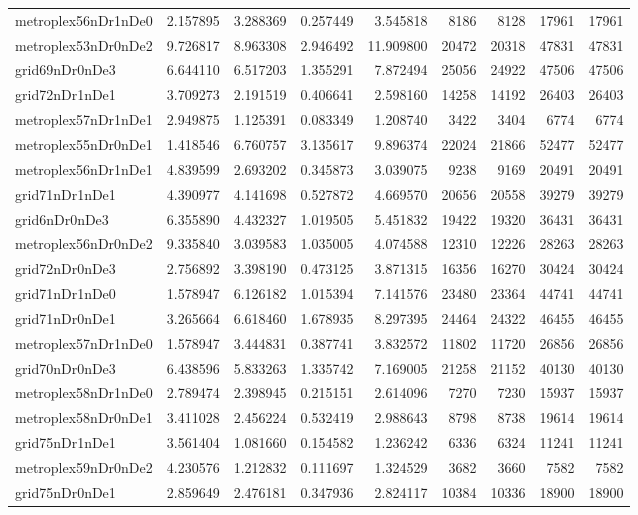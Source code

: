\begin{longtable}{|l|r|r|r|r|r|r|r|r|}
metroplex56nDr1nDe0 & 2.157895 & 3.288369 & 0.257449 & 3.545818 & 8186 & 8128 & 17961 & 17961 \\
metroplex53nDr0nDe2 & 9.726817 & 8.963308 & 2.946492 & 11.909800 & 20472 & 20318 & 47831 & 47831 \\
grid69nDr0nDe3 & 6.644110 & 6.517203 & 1.355291 & 7.872494 & 25056 & 24922 & 47506 & 47506 \\
grid72nDr1nDe1 & 3.709273 & 2.191519 & 0.406641 & 2.598160 & 14258 & 14192 & 26403 & 26403 \\
metroplex57nDr1nDe1 & 2.949875 & 1.125391 & 0.083349 & 1.208740 & 3422 & 3404 & 6774 & 6774 \\
metroplex55nDr0nDe1 & 1.418546 & 6.760757 & 3.135617 & 9.896374 & 22024 & 21866 & 52477 & 52477 \\
metroplex56nDr1nDe1 & 4.839599 & 2.693202 & 0.345873 & 3.039075 & 9238 & 9169 & 20491 & 20491 \\
grid71nDr1nDe1 & 4.390977 & 4.141698 & 0.527872 & 4.669570 & 20656 & 20558 & 39279 & 39279 \\
grid6nDr0nDe3 & 6.355890 & 4.432327 & 1.019505 & 5.451832 & 19422 & 19320 & 36431 & 36431 \\
metroplex56nDr0nDe2 & 9.335840 & 3.039583 & 1.035005 & 4.074588 & 12310 & 12226 & 28263 & 28263 \\
grid72nDr0nDe3 & 2.756892 & 3.398190 & 0.473125 & 3.871315 & 16356 & 16270 & 30424 & 30424 \\
grid71nDr1nDe0 & 1.578947 & 6.126182 & 1.015394 & 7.141576 & 23480 & 23364 & 44741 & 44741 \\
grid71nDr0nDe1 & 3.265664 & 6.618460 & 1.678935 & 8.297395 & 24464 & 24322 & 46455 & 46455 \\
metroplex57nDr1nDe0 & 1.578947 & 3.444831 & 0.387741 & 3.832572 & 11802 & 11720 & 26856 & 26856 \\
grid70nDr0nDe3 & 6.438596 & 5.833263 & 1.335742 & 7.169005 & 21258 & 21152 & 40130 & 40130 \\
metroplex58nDr1nDe0 & 2.789474 & 2.398945 & 0.215151 & 2.614096 & 7270 & 7230 & 15937 & 15937 \\
metroplex58nDr0nDe1 & 3.411028 & 2.456224 & 0.532419 & 2.988643 & 8798 & 8738 & 19614 & 19614 \\
grid75nDr1nDe1 & 3.561404 & 1.081660 & 0.154582 & 1.236242 & 6336 & 6324 & 11241 & 11241 \\
metroplex59nDr0nDe2 & 4.230576 & 1.212832 & 0.111697 & 1.324529 & 3682 & 3660 & 7582 & 7582 \\
grid75nDr0nDe1 & 2.859649 & 2.476181 & 0.347936 & 2.824117 & 10384 & 10336 & 18900 & 18900 \\

\end{longtable}
